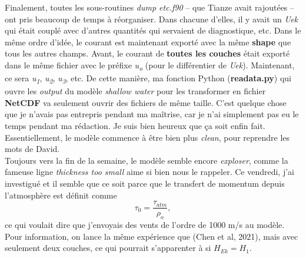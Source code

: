 \documentclass{article}
\numberwithin{equation}{section}
\begin{document}
Finalement, toutes les sous-routines \emph{dump etc.f90} -- que Tianze avait rajoutées -- ont pris beaucoup de temps à réorganiser.
Dans chacune d'elles, il y avait un \emph{Uek} qui était couplé avec d'autres quantités qui servaient de diagnostique, etc.
Dans le même ordre d'idée, le courant est maintenant exporté avec la même \textbf{shape} que tous les autres champs.
Avant, le courant de \textbf{toutes les couches} était exporté dans le même fichier avec le préfixe \emph{u\textsubscript{o}} (pour le différentier de \emph{Uek}). 
Maintenant, ce sera \emph{u\textsubscript{1}}, \emph{u\textsubscript{2}}, \emph{u\textsubscript{3}}, etc.
De cette manière, ma fonction Python (\textbf{readata.py}) qui ouvre les \emph{output} du modèle \emph{shallow water} pour les transformer en fichier \textbf{NetCDF} va seulement ouvrir des fichiers de même taille.
C'est quelque chose que je n'avais pas entrepris pendant ma maîtrise, car je n'ai simplement pas eu le temps pendant ma rédaction.
Je suis bien heureux que ça soit enfin fait.
Essentiellement, le modèle commence à être bien plus \emph{clean}, pour reprendre les mots de David.\\[0pt]

Toujours vers la fin de la semaine, le modèle semble encore \emph{exploser}, comme la fameuse ligne \emph{thickness too small} aime si bien nous le rappeler. 
Ce vendredi, j'ai investigué et il semble que ce soit parce que le transfert de momentum depuis l'atmosphère est définit comme 
\begin{equation}
\tau_0 = \frac{\tau_{atm}}{\rho_o},
\end{equation}
ce qui voulait dire que j'envoyais des vents de l'ordre de 1000 m/s au modèle.
Pour information, on lance la même expérience que (Chen et al, 2021), mais avec seulement deux couches, ce qui pourrait s'apparenter à si \(H_{Ek} = H_1\).
\end{document}
